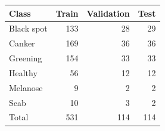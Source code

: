 \begin{tabular}{lrrr}
\toprule
Class & Train & Validation & Test \\
\midrule
Black spot & 133 & 28 & 29 \\
Canker & 169 & 36 & 36 \\
Greening & 154 & 33 & 33 \\
Healthy & 56 & 12 & 12 \\
Melanose & 9 & 2 & 2 \\
Scab & 10 & 3 & 2 \\
\midrule
Total & 531 & 114 & 114 \\
\bottomrule
\end{tabular}
